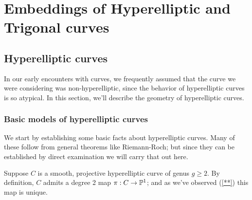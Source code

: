 

\chapter{Embeddings of Hyperelliptic and Trigonal curves}
\label{ScrollsChapter}
\section{Hyperelliptic curves}

In our early encounters with curves, we frequently assumed that the curve we were considering was non-hyperelliptic, since the behavior of hyperelliptic curves is so atypical. In this section, we'll describe the geometry of hyperelliptic curves.

\subsection{Basic models of hyperelliptic curves}

We start by establishing some basic facts about hyperelliptic curves. Many of these follow from general theorems like Riemann-Roch; but since they can be established by direct examination we will carry that out here.

Suppose $C$ is a smooth, projective hyperelliptic curve of genus $g \geq 2$. By definition, $C$ admits a degree 2 map $\pi : C \to \PP^1$; and as we've observed (\ref{**}) this map is unique.

